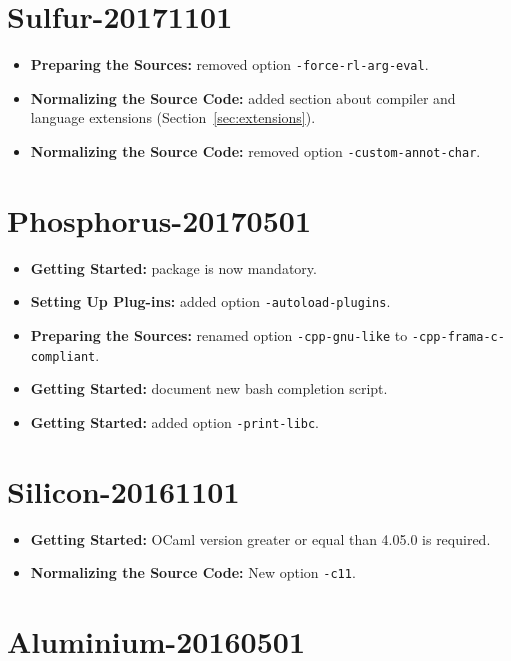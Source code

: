 \section*{Sulfur-20171101}

\begin{itemize}
\item \textbf{Preparing the Sources:} removed option
  \texttt{-force-rl-arg-eval}.
\item \textbf{Normalizing the Source Code:} added section about compiler
  and language extensions (Section~\ref{sec:extensions}).
\item \textbf{Normalizing the Source Code:} removed option
  \texttt{-custom-annot-char}.
\end{itemize}

\section*{Phosphorus-20170501}

\begin{itemize}
\item \textbf{Getting Started:}  package is now mandatory.
\item \textbf{Setting Up Plug-ins:} added option \texttt{-autoload-plugins}.
\item \textbf{Preparing the Sources:} renamed option \texttt{-cpp-gnu-like}
  to \texttt{-cpp-frama-c-compliant}.
\item \textbf{Getting Started:} document new bash completion script.
\item \textbf{Getting Started:} added option \texttt{-print-libc}.
\end{itemize}

\section*{Silicon-20161101}

\begin{itemize}
\item \textbf{Getting Started:} OCaml version greater or equal than 4.05.0 is required.
\item \textbf{Normalizing the Source Code:} New option \texttt{-c11}.
\end{itemize}

\section*{Aluminium-20160501}

